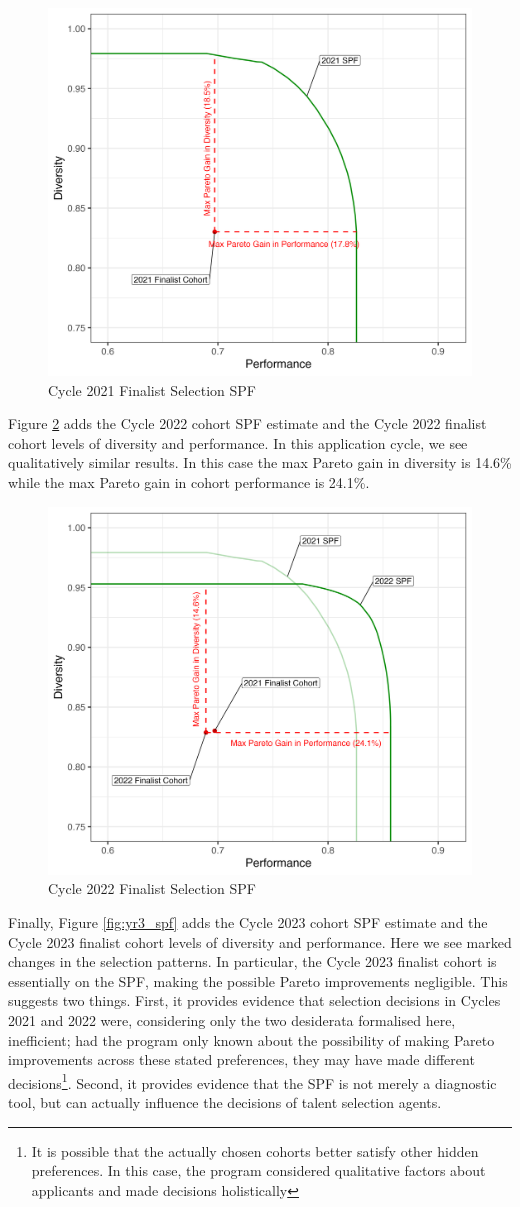 \begin{figure}[htb]
    \centering
    \includegraphics[width=.6\textwidth,keepaspectratio]{figures/spf/yr1_spf_finalist.png} 
    \caption{Cycle 2021 Finalist Selection SPF}\label{fig:yr1_spf}
\end{figure}

Figure \ref{fig:yr2_spf} adds the Cycle 2022 cohort SPF estimate and the Cycle 2022 finalist cohort levels of diversity and performance. In this application cycle, we see qualitatively similar results. In this case the max Pareto gain in diversity is 14.6\% while the max Pareto gain in cohort performance is 24.1\%.

\begin{figure}[htb]
    \centering
    \includegraphics[width=.6\textwidth,keepaspectratio]{figures/spf/yr2_spf_finalist.png}
    \caption{Cycle 2022 Finalist Selection SPF}\label{fig:yr2_spf}
\end{figure}

Finally, Figure \ref{fig:yr3_spf} adds the Cycle 2023 cohort SPF estimate and the Cycle 2023 finalist cohort levels of diversity and performance. Here we see marked changes in the selection patterns. In particular, the Cycle 2023 finalist cohort is essentially on the SPF, making the possible Pareto improvements negligible. This suggests two things. First, it provides evidence that selection decisions in Cycles 2021 and 2022 were, considering only the two desiderata formalised here, inefficient; had the program only known about the possibility of making Pareto improvements across these stated preferences, they may have made different decisions\footnote{It is possible that the actually chosen cohorts better satisfy other hidden preferences. In this case, the program considered qualitative factors about applicants and made decisions holistically}. Second, it provides evidence that the SPF is not merely a diagnostic tool, but can actually influence the decisions of talent selection agents.

